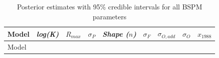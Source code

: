 \documentclass[
  11pt,
]{SCreport}
\begin{document}
\begin{landscape}

\begin{longtable}[]{@{}
  >{\raggedright\arraybackslash}p{}
  >{\raggedright\arraybackslash}p{}
  >{\raggedright\arraybackslash}p{}
  >{\raggedright\arraybackslash}p{}
  >{\raggedright\arraybackslash}p{}
  >{\raggedright\arraybackslash}p{}
  >{\raggedright\arraybackslash}p{}
  >{\raggedright\arraybackslash}p{}
  >{\raggedright\arraybackslash}p{}@{}}
\caption{Posterior estimates with 95\% credible intervals for all BSPM
parameters}\label{tbl-param-hmc}\tabularnewline
\toprule\noalign{}
\begin{minipage}[b]{\linewidth}\raggedright
Model
\end{minipage} & \begin{minipage}[b]{\linewidth}\raggedright
\emph{log(K)}
\end{minipage} & \begin{minipage}[b]{\linewidth}\raggedright
\(R_{max}\)
\end{minipage} & \begin{minipage}[b]{\linewidth}\raggedright
\(\sigma_P\)
\end{minipage} & \begin{minipage}[b]{\linewidth}\raggedright
\emph{Shape (\(n\))}
\end{minipage} & \begin{minipage}[b]{\linewidth}\raggedright
\(\sigma_F\)
\end{minipage} & \begin{minipage}[b]{\linewidth}\raggedright
\(\sigma_{O,add}\)
\end{minipage} & \begin{minipage}[b]{\linewidth}\raggedright
\(\sigma_{O}\)
\end{minipage} & \begin{minipage}[b]{\linewidth}\raggedright
\(x_{1988}\)
\end{minipage} \\
\midrule\noalign{}
\endfirsthead
\toprule\noalign{}
\begin{minipage}[b]{\linewidth}\raggedright
Model
\end{minipage} & \begin{minipage}[b]{\linewidth}\raggedright

\end{minipage}
\end{longtable}
\end{landscape}
\end{document}
